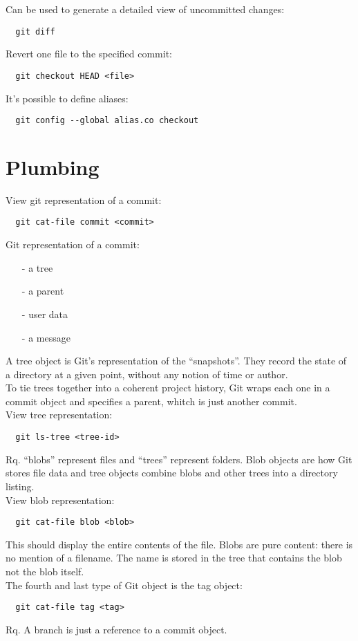 \documentclass[french]{article}
\begin{document}
Can be used to generate a detailed view of uncommitted changes:
\begin{verbatim}
  git diff
\end{verbatim}

Revert one file to the specified commit:
\begin{verbatim}
  git checkout HEAD <file>
\end{verbatim}

It's possible to define aliases:
\begin{verbatim}
  git config --global alias.co checkout
\end{verbatim}

\section{Plumbing}

View git representation of a commit:
\begin{verbatim}
  git cat-file commit <commit>
\end{verbatim}

Git representation of a commit:
\begin{itemize}
  \item [-] a tree
  \item [-] a parent
  \item [-] user data
  \item [-] a message
\end{itemize}
$ $\\
A tree object is Git's representation of the ``snapshots''. They record the state of a directory at a given point, without any notion of time or author.\\
To tie trees together into a coherent project history, Git wraps each one in a commit object and specifies a parent, whitch is just another commit.\\

View tree representation:
\begin{verbatim}
  git ls-tree <tree-id>
\end{verbatim}
Rq. ``blobs'' represent files and ``trees'' represent folders. Blob objects are how Git stores file data and tree objects combine blobs and other trees into a directory listing.\\

View blob representation:
\begin{verbatim}
  git cat-file blob <blob>
\end{verbatim}
This should display the entire contents of the file. Blobs are pure content: there is no mention of a filename. The name is stored in the tree that contains the blob not the blob itself.\\

The fourth and last type of Git object is the tag object:
\begin{verbatim}
  git cat-file tag <tag>
\end{verbatim}

Rq. A branch is just a reference to a commit object.
\end{document}
